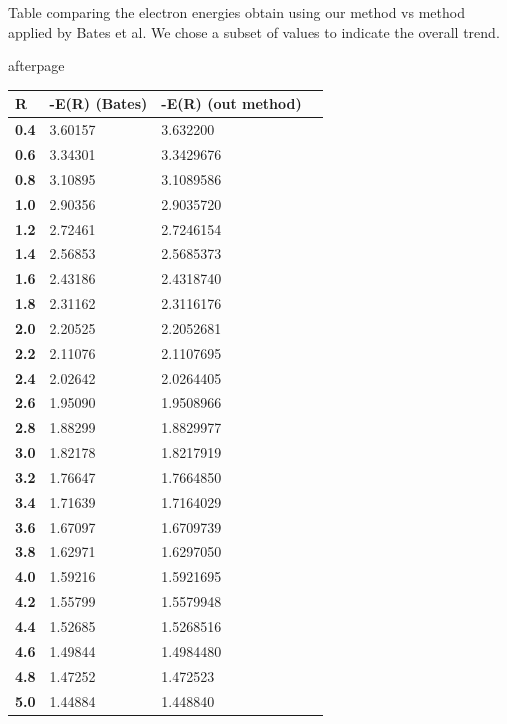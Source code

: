 Table comparing the electron  energies obtain using our method vs method applied by Bates et al. We chose a subset of values to indicate the overall trend.

afterpage{
  \captionsetup{type=figure}
  \label{tab:UsVsBates}
    \begin{tabular}{ >{\bfseries}m{4em} m{4em}  m{4em}  m{4em} }
      \hline
      R & -E(R) (Bates) & -E(R) (out method)  \\ \hline \hline
      0.4 & 3.60157 & 3.632200 \\[-1em]
      0.6 & 3.34301 & 3.3429676 \\[-1em]
      0.8 & 3.10895 & 3.1089586 \\[-1em]
      1.0 & 2.90356 & 2.9035720 \\[-1em]
      1.2 & 2.72461 & 2.7246154 \\[-1em]
      1.4 & 2.56853 & 2.5685373 \\[-1em]
      1.6 & 2.43186 & 2.4318740 \\[-1em]
      1.8 & 2.31162 & 2.3116176 \\[-1em]
      2.0 & 2.20525 & 2.2052681 \\[-1em]
      2.2 & 2.11076 & 2.1107695 \\[-1em] 
      2.4 & 2.02642 & 2.0264405 \\[-1em]
      2.6 & 1.95090 & 1.9508966 \\[-1em]
      2.8 & 1.88299 & 1.8829977 \\[-1em]
      3.0 & 1.82178 & 1.8217919 \\[-1em]
      3.2 & 1.76647 & 1.7664850 \\[-1em]
      3.4 & 1.71639 & 1.7164029 \\[-1em]
      3.6 & 1.67097 & 1.6709739 \\[-1em]
      3.8 & 1.62971 & 1.6297050 \\[-1em]
      4.0 & 1.59216 & 1.5921695 \\[-1em]
      4.2 & 1.55799 & 1.5579948 \\[-1em]
      4.4 & 1.52685 & 1.5268516 \\[-1em]
      4.6 & 1.49844 & 1.4984480 \\[-1em]
      4.8 & 1.47252 & 1.472523 \\[-1em]
      5.0 & 1.44884 & 1.448840 \\[-1em]
    \hline
    \end{tabular}
}
